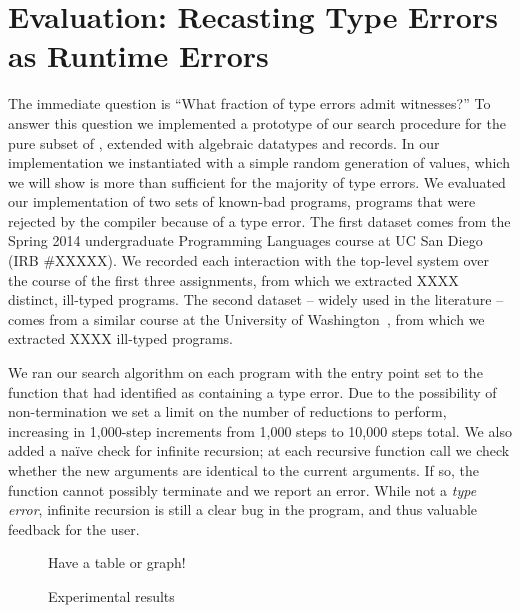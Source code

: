 \section{Evaluation: Recasting Type Errors as Runtime Errors}
\label{sec:eval-witness}
%
The immediate question is ``What fraction of type errors admit
witnesses?''
%
To answer this question we implemented a prototype of our search
procedure for the pure subset of \ocaml, \ie \lang extended with
algebraic datatypes and records. 
%
In our implementation we instantiated \gensym with a simple random
generation of values, which we will show is more than sufficient for the
majority of type errors.
%
We evaluated our implementation of two sets of known-bad programs, \ie
programs that were rejected by the \ocaml compiler because of a type
error.
%
The first dataset comes from the Spring 2014 undergraduate Programming
Languages course at UC San Diego (IRB \#XXXXX). 
%
We recorded each interaction with the \ocaml top-level system over the
course of the first three assignments, from which we extracted XXXX
distinct, ill-typed \ocaml programs.
%
The second dataset -- widely used in the literature -- comes from a
similar course at the University of Washington~\cite{XXXXX}, from which
we extracted XXXX ill-typed programs.

We ran our search algorithm on each program with the entry point set to
the function that \ocaml had identified as containing a type error. 
%
Due to the possibility of non-termination we set a limit on the number
of reductions to perform, increasing in 1,000-step increments from 1,000
steps to 10,000 steps total.
%
We also added a na\"ive check for infinite recursion; at each recursive
function call we check whether the new arguments are identical to the
current arguments.
%
If so, the function cannot possibly terminate and we report an error.
%
While not a \emph{type error}, infinite recursion is still a clear bug
in the program, and thus valuable feedback for the user.

\begin{figure}[t]
  \centering 

  Have a table or graph! 
\caption{Experimental results}
\label{fig:results-witness}
\end{figure}

